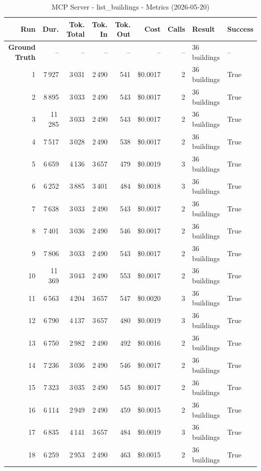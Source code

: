 \documentclass[a4paper,11pt]{article}
\begin{document}
\begin{table}[ht]
\centering
\scriptsize
\caption{MCP Server - list\_buildings - Metrics (2026-05-20)}
\label{tab:mcp\_list\_buildings\_metrics\_2026-05-20}
\begin{tabular}{r r r r r r r p{3cm} l}
\hline
Run & Dur. & Tok. Total & Tok. In & Tok. Out & Cost & Calls & Result & Success \\
\hline
\textbf{Ground Truth} & -- & -- & -- & -- & -- & -- & 36 buildings & -- \\
\hline
1 & 7\,927 & 3\,031 & 2\,490 & 541 & \$0.0017 & 2 & 36 buildings & True \\
2 & 8\,895 & 3\,033 & 2\,490 & 543 & \$0.0017 & 2 & 36 buildings & True \\
3 & 11\,285 & 3\,033 & 2\,490 & 543 & \$0.0017 & 2 & 36 buildings & True \\
4 & 7\,517 & 3\,028 & 2\,490 & 538 & \$0.0017 & 2 & 36 buildings & True \\
5 & 6\,659 & 4\,136 & 3\,657 & 479 & \$0.0019 & 3 & 36 buildings & True \\
6 & 6\,252 & 3\,885 & 3\,401 & 484 & \$0.0018 & 3 & 36 buildings & True \\
7 & 7\,638 & 3\,033 & 2\,490 & 543 & \$0.0017 & 2 & 36 buildings & True \\
8 & 7\,401 & 3\,036 & 2\,490 & 546 & \$0.0017 & 2 & 36 buildings & True \\
9 & 7\,806 & 3\,033 & 2\,490 & 543 & \$0.0017 & 2 & 36 buildings & True \\
10 & 11\,369 & 3\,043 & 2\,490 & 553 & \$0.0017 & 2 & 36 buildings & True \\
11 & 6\,563 & 4\,204 & 3\,657 & 547 & \$0.0020 & 3 & 36 buildings & True \\
12 & 6\,790 & 4\,137 & 3\,657 & 480 & \$0.0019 & 3 & 36 buildings & True \\
13 & 6\,750 & 2\,982 & 2\,490 & 492 & \$0.0016 & 2 & 36 buildings & True \\
14 & 7\,236 & 3\,036 & 2\,490 & 546 & \$0.0017 & 2 & 36 buildings & True \\
15 & 7\,323 & 3\,035 & 2\,490 & 545 & \$0.0017 & 2 & 36 buildings & True \\
16 & 6\,114 & 2\,949 & 2\,490 & 459 & \$0.0015 & 2 & 36 buildings & True \\
17 & 6\,835 & 4\,141 & 3\,657 & 484 & \$0.0019 & 3 & 36 buildings & True \\
18 & 6\,259 & 2\,953 & 2\,490 & 463 & \$0.0015 & 2 & 36 buildings & True \\

\end{tabular}
\end{table}
\end{document}
